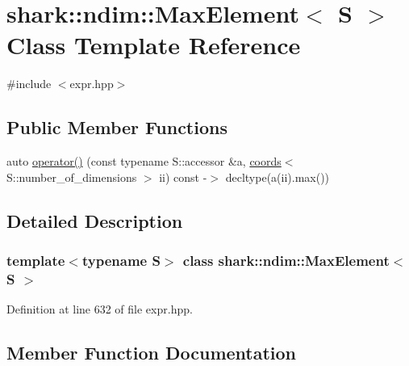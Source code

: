 \hypertarget{classshark_1_1ndim_1_1_max_element}{}\section{shark\+:\+:ndim\+:\+:Max\+Element$<$ S $>$ Class Template Reference}
\label{classshark_1_1ndim_1_1_max_element}


{\ttfamily \#include $<$expr.\+hpp$>$}

\subsection*{Public Member Functions}
\begin{DoxyCompactItemize}
\item 
auto \hyperlink{classshark_1_1ndim_1_1_max_element_a7130c9b87070f3ff75bc5325f673898a}{operator()} (const typename S\+::accessor \&a, \hyperlink{structshark_1_1ndim_1_1coords}{coords}$<$ S\+::number\+\_\+of\+\_\+dimensions $>$ ii) const -\/$>$ decltype(a(ii).max())
\end{DoxyCompactItemize}


\subsection{Detailed Description}
\subsubsection*{template$<$typename S$>$\newline
class shark\+::ndim\+::\+Max\+Element$<$ S $>$}



Definition at line 632 of file expr.\+hpp.



\subsection{Member Function Documentation}
\hypertarget{classshark_1_1ndim_1_1_max_element_a7130c9b87070f3ff75bc5325f673898a}{}\label{classshark_1_1ndim_1_1_max_element_a7130c9b87070f3ff75bc5325f673898a} 
